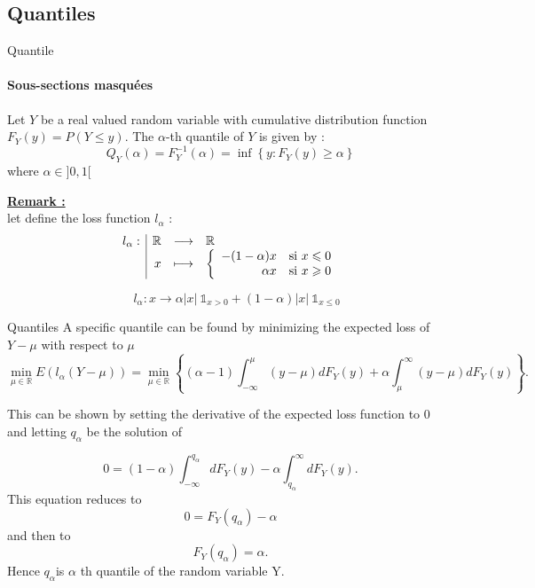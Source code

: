 \documentclass[unknownkeysallowed]{beamer}
\begin{document}
\subsection{Quantiles}
\label{sub:Quantiles}
\begin{frame}{Quantile}
  \framesubtitle{Sous-sections masquées}
{
Let $Y$ be a real valued random variable with cumulative distribution function $ F_{Y}(y)=P(Y\leq y)$.
The $\alpha$-th quantile of $Y$ is given by :
$$
 Q_{Y}(\alpha )=F_{Y}^{-1}(\alpha )=\inf \left\{y:F_{Y}(y)\geq \alpha \right\}
$$
where  $\alpha \in ]0,1[$
}

\vspace{0.25cm}

\underline{\textbf{Remark :}}\\
let define the loss function $l_{\alpha}$ : 
$$\begin{array}{l|rcl}
    l_{\alpha} : & \mathbb{R} & \longrightarrow & \mathbb{R} \\
    & x & \longmapsto &  
    \left \{
   \begin{array}{r c l}
      -(1-\alpha) x \quad \text{si $x\leqslant 0$}\\
      \alpha x \quad \text{si $x\geqslant 0$}
   \end{array}
   \right .
\end{array}$$

$$\quad  l_{\alpha}:x \rightarrow \alpha |x|~  \mathds{1}_{x >0} + (1-\alpha) |x|~ \mathds{1}_{x \leqslant 0}$$

\end{frame}




\begin{frame}{Quantiles}
A specific quantile can be found by minimizing the expected loss of $Y-\mu$ with respect to $\mu$  \\

$$
\underset {\mu \in \mathbb{R}}{\min }E(l _{\alpha }(Y-\mu))= {\underset {\mu \in \mathbb{R}}{\min }} \left\{(\alpha -1)\int _{-\infty }^{\mu}(y-\mu)dF_{Y}(y)+\alpha \int _{\mu}^{\infty }(y-\mu)dF_{Y}(y)\right\}.
$$

This can be shown by setting the derivative of the expected loss function to $0$ and letting $q_{\alpha }$ be the solution of

$$
0=(1-\alpha)\int_{-\infty}^{q_{\alpha}}dF_{Y}(y)-\alpha\int_{q_{\alpha}}^{\infty}dF_{Y}(y).
$$
This equation reduces to
$$
0=F_{Y}(q_{\alpha })-\alpha
$$
and then to
$$
F_{Y}(q_{\alpha })=\alpha .
$$
Hence $ q_{\alpha}$is $\alpha$ th quantile of the random variable Y.

\end{frame}
\end{document}
